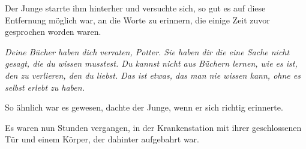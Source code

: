 Der Junge starrte ihm hinterher und versuchte sich, so gut es auf diese Entfernung möglich war, an die Worte zu erinnern, die einige Zeit zuvor gesprochen worden waren.

\emph{Deine Bücher haben dich verraten, Potter. Sie haben dir die eine Sache nicht gesagt, die du wissen musstest. Du kannst nicht aus Büchern lernen, wie es ist, den zu verlieren, den du liebst. Das ist etwas, das man nie wissen kann, ohne es selbst erlebt zu haben.}

So ähnlich war es gewesen, dachte der Junge, wenn er sich richtig erinnerte.

\later

Es waren nun Stunden vergangen, in der Krankenstation mit ihrer geschlossenen Tür und einem Körper, der dahinter aufgebahrt war.

